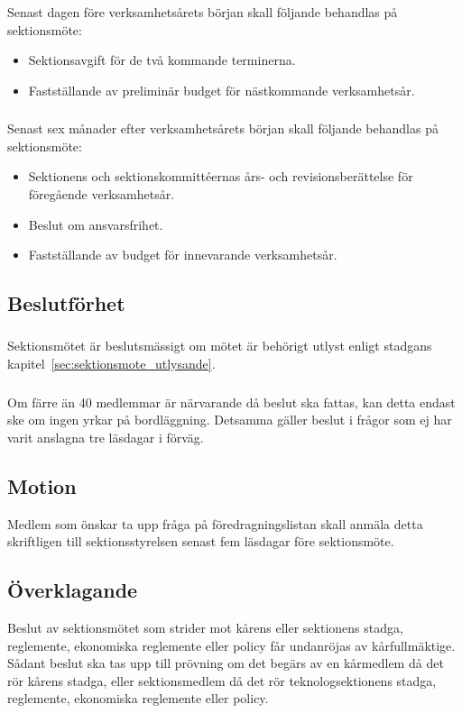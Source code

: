 \documentclass[a4paper]{dtek}
\begin{document}
\subsubsection{}
Senast dagen före verksamhetsårets början skall följande behandlas på sektionsmöte:
\begin{itemize}
\item Sektionsavgift för de två kommande terminerna.
\item Fastställande av preliminär budget för nästkommande verksamhetsår.
\end{itemize}
\subsubsection{}
Senast sex månader efter verksamhetsårets början skall följande behandlas på sektionsmöte:
\begin{itemize}
\item Sektionens och sektionskommittéernas års- och revisionsberättelse för föregående verksamhetsår.
\item Beslut om ansvarsfrihet.
\item Fastställande av budget för innevarande verksamhetsår.
\end{itemize}
\subsection{Beslutförhet}
\subsubsection{}
Sektionsmötet är beslutsmässigt om mötet är behörigt utlyst enligt stadgans kapitel~\ref{sec:sektionsmote_utlysande}.
\subsubsection{}
Om färre än 40 medlemmar är närvarande då beslut ska fattas, kan detta endast ske om ingen yrkar på bordläggning. Detsamma gäller beslut i frågor som ej har varit anslagna tre läsdagar i förväg.
\subsection{Motion}
Medlem som önskar ta upp fråga på föredragningslistan skall anmäla detta skriftligen till sektionsstyrelsen senast fem läsdagar före sektionsmöte.
\subsection{Överklagande}
Beslut av sektionsmötet som strider mot kårens eller sektionens stadga, reglemente, ekonomiska reglemente eller policy får undanröjas av kårfullmäktige. Sådant beslut ska tas upp till prövning om det begärs av en kårmedlem då det rör kårens stadga, eller sektionsmedlem då det rör teknologsektionens stadga, reglemente, ekonomiska reglemente eller policy.
\end{document}
